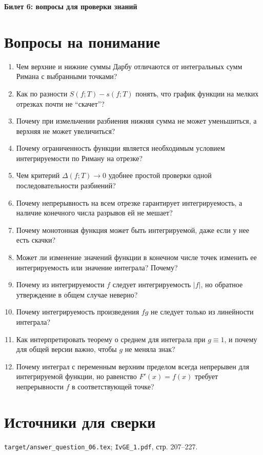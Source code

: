 \documentclass[12pt,a4paper]{article}
\begin{document}
\begin{center}
{\Large\bfseries Билет 6: вопросы для проверки знаний}
\end{center}

\noindent{}

\section*{Вопросы на понимание}

\begin{enumerate}
\item Чем верхние и нижние суммы Дарбу отличаются от интегральных сумм Римана с выбранными точками?
\item Как по разности \(S(f;T)-s(f;T)\) понять, что график функции на мелких отрезках почти не ``скачет''?
\item Почему при измельчении разбиения нижняя сумма не может уменьшиться, а верхняя не может увеличиться?
\item Почему ограниченность функции является необходимым условием интегрируемости по Риману на отрезке?
\item Чем критерий \(\Delta(f;T)\to0\) удобнее простой проверки одной последовательности разбиений?
\item Почему непрерывность на всем отрезке гарантирует интегрируемость, а наличие конечного числа разрывов ей не мешает?
\item Почему монотонная функция может быть интегрируемой, даже если у нее есть скачки?
\item Может ли изменение значений функции в конечном числе точек изменить ее интегрируемость или значение интеграла? Почему?
\item Почему из интегрируемости \(f\) следует интегрируемость \(|f|\), но обратное утверждение в общем случае неверно?
\item Почему интегрируемость произведения \(fg\) не следует только из линейности интеграла?
\item Как интерпретировать теорему о среднем для интеграла при \(g\equiv1\), и почему для общей версии важно, чтобы \(g\) не меняла знак?
\item Почему интеграл с переменным верхним пределом всегда непрерывен для интегрируемой функции, но равенство \(F'(x)=f(x)\) требует непрерывности \(f\) в соответствующей точке?
\end{enumerate}

\section*{Источники для сверки}

\texttt{target/answer\_question\_06.tex};
\texttt{IvGE\_1.pdf}, стр. 207--227.
\end{document}
